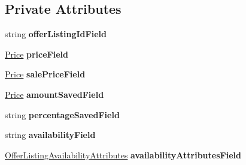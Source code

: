 \subsection*{Private Attributes}
\begin{DoxyCompactItemize}
\item 
\hypertarget{class_price___comparison_1_1amazon_1_1ecs_1_1_offer_listing_a32735941cdfca0b16bb3c8f6d19c5955}{string {\bfseries offer\-Listing\-Id\-Field}}\label{class_price___comparison_1_1amazon_1_1ecs_1_1_offer_listing_a32735941cdfca0b16bb3c8f6d19c5955}

\item 
\hypertarget{class_price___comparison_1_1amazon_1_1ecs_1_1_offer_listing_a63daf76e6edad848227936e075203ea5}{\hyperlink{class_price___comparison_1_1amazon_1_1ecs_1_1_price}{Price} {\bfseries price\-Field}}\label{class_price___comparison_1_1amazon_1_1ecs_1_1_offer_listing_a63daf76e6edad848227936e075203ea5}

\item 
\hypertarget{class_price___comparison_1_1amazon_1_1ecs_1_1_offer_listing_ac3b2ea8056ca1611562decbec4331e36}{\hyperlink{class_price___comparison_1_1amazon_1_1ecs_1_1_price}{Price} {\bfseries sale\-Price\-Field}}\label{class_price___comparison_1_1amazon_1_1ecs_1_1_offer_listing_ac3b2ea8056ca1611562decbec4331e36}

\item 
\hypertarget{class_price___comparison_1_1amazon_1_1ecs_1_1_offer_listing_a07189fab253717ecd9102abef3f77c39}{\hyperlink{class_price___comparison_1_1amazon_1_1ecs_1_1_price}{Price} {\bfseries amount\-Saved\-Field}}\label{class_price___comparison_1_1amazon_1_1ecs_1_1_offer_listing_a07189fab253717ecd9102abef3f77c39}

\item 
\hypertarget{class_price___comparison_1_1amazon_1_1ecs_1_1_offer_listing_a72b8b1d6f1f1f6583f16de0c3f540255}{string {\bfseries percentage\-Saved\-Field}}\label{class_price___comparison_1_1amazon_1_1ecs_1_1_offer_listing_a72b8b1d6f1f1f6583f16de0c3f540255}

\item 
\hypertarget{class_price___comparison_1_1amazon_1_1ecs_1_1_offer_listing_adb6cff1a8cb752b9795f5453f155f1da}{string {\bfseries availability\-Field}}\label{class_price___comparison_1_1amazon_1_1ecs_1_1_offer_listing_adb6cff1a8cb752b9795f5453f155f1da}

\item 
\hypertarget{class_price___comparison_1_1amazon_1_1ecs_1_1_offer_listing_ac17557f974db6f29cb3f9696322470c7}{\hyperlink{class_price___comparison_1_1amazon_1_1ecs_1_1_offer_listing_availability_attributes}{Offer\-Listing\-Availability\-Attributes} {\bfseries availability\-Attributes\-Field}}\label{class_price___comparison_1_1amazon_1_1ecs_1_1_offer_listing_ac17557f974db6f29cb3f9696322470c7}


\end{DoxyCompactItemize}
